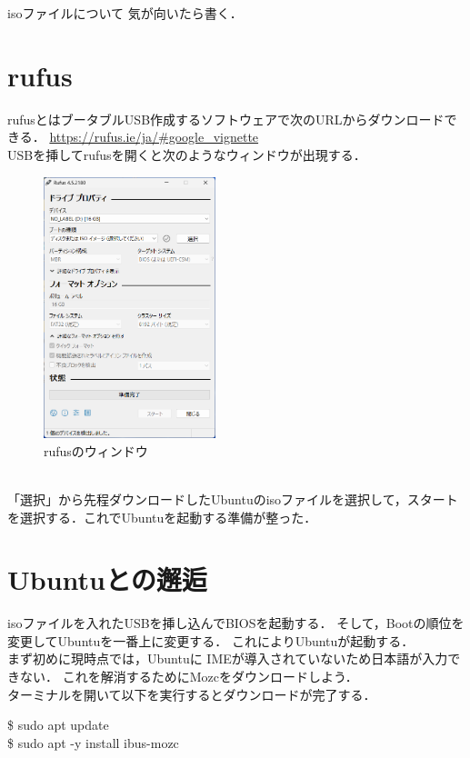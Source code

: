\documentclass[dvipdfmx,a4paper,11pt]{jsbook}
\begin{document}
\begin{mainbox}{isoファイルについて}
  気が向いたら書く．
\end{mainbox}


\section{rufus}

rufusとはブータブルUSB作成するソフトウェアで次のURLからダウンロードできる．
\url{https://rufus.ie/ja/#google_vignette}\\
USBを挿してrufusを開くと次のようなウィンドウが出現する．
\begin{figure}[htbp]
  \begin{center}
    \includegraphics[width = 50mm]{rufus.png}
    \caption{rufusのウィンドウ}
  \end{center}
\end{figure}
\\
「選択」から先程ダウンロードしたUbuntuのisoファイルを選択して，スタートを選択する．これでUbuntuを起動する準備が整った．

\section{Ubuntuとの邂逅}
isoファイルを入れたUSBを挿し込んでBIOSを起動する．
そして，Bootの順位を変更してUbuntuを一番上に変更する．
これによりUbuntuが起動する．\\
まず初めに現時点では，Ubuntuに
IMEが導入されていないため日本語が入力できない．
これを解消するためにMozcをダウンロードしよう．\\
ターミナルを開いて以下を実行するとダウンロードが完了する．

\begin{tcolorbox}[terminalbox]
  \$ sudo apt update\\
  \$ sudo apt -y install ibus-mozc
\end{tcolorbox}
\end{document}
